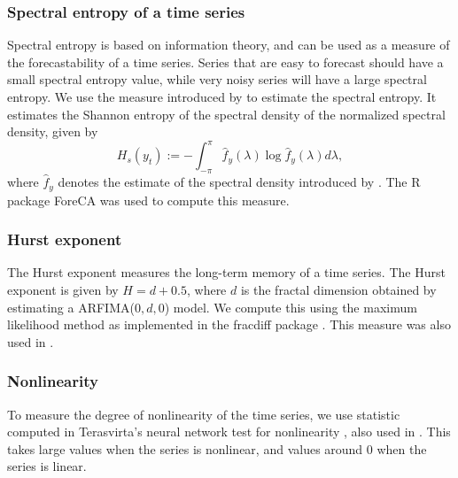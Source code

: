 \documentclass[11pt,a4paper,]{article}
\theoremstyle{definition}
\theoremstyle{definition}
\theoremstyle{definition}
\theoremstyle{remark}
\begin{document}
\hypertarget{spectral-entropy-of-a-time-series}{%
\subsubsection*{Spectral entropy of a time
series}\label{spectral-entropy-of-a-time-series}}

Spectral entropy is based on information theory, and can be used as a
measure of the forecastability of a time series. Series that are easy to
forecast should have a small spectral entropy value, while very noisy
series will have a large spectral entropy. We use the measure introduced
by \textcite{goerg2013forecastable} to estimate the spectral entropy. It
estimates the Shannon entropy of the spectral density of the normalized
spectral density, given by \[ 
  H_{s}(y_t):=-\int_{-\pi}^{\pi}\hat f_y(\lambda)\log \hat f_y({\lambda})d\lambda,
\] where \(\hat{f}_y\) denotes the estimate of the spectral density
introduced by \textcite{nuttall1982spectral}. The R package ForeCA
\autocite{Foreca} was used to compute this measure.

\hypertarget{hurst-exponent}{%
\subsubsection*{Hurst exponent}\label{hurst-exponent}}

The Hurst exponent measures the long-term memory of a time series. The
Hurst exponent is given by \(H=d+0.5\), where \(d\) is the fractal
dimension obtained by estimating a ARFIMA(\(0, d, 0\)) model. We compute
this using the maximum likelihood method \autocite{haslett1989space} as
implemented in the fracdiff package \autocite{fracdiff}. This measure
was also used in \textcite{wang2009rule}.

\hypertarget{nonlinearity}{%
\subsubsection*{Nonlinearity}\label{nonlinearity}}

To measure the degree of nonlinearity of the time series, we use
statistic computed in Terasvirta's neural network test for nonlinearity
\autocite{nonlintest}, also used in \textcite{wang2009rule}. This takes
large values when the series is nonlinear, and values around 0 when the
series is linear.
\end{document}

